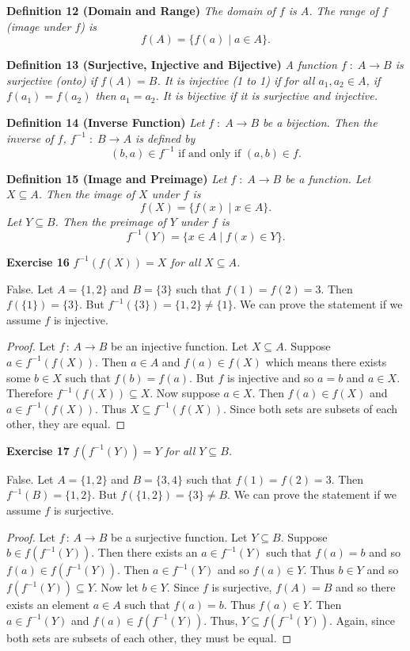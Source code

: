 \documentclass{article}
\begin{document}
\begin{flushleft}
\textbf{Definition 12 (Domain and Range)}
\textsl{The domain of $f$ is $A$. The range of $f$ (image under $f$) is
\[
f(A) = \{f(a) \mid a \in A\}.
\]}

\textbf{Definition 13 (Surjective, Injective and Bijective)}
\textsl{A function $f \; : \; A \rightarrow B$ is surjective (onto) if $f(A) = B$. It is injective (1 to 1) if for all $a_1,a_2 \in A$, if $f(a_1)=f(a_2)$ then $a_1=a_2$. It is bijective if it is surjective and injective.}\newline

\textbf{Definition 14 (Inverse Function)}
\textsl{Let $f \; : \; A \rightarrow B$ be a bijection. Then the inverse of $f$, $f^{-1} \; : \; B \rightarrow A$ is defined by
\[
(b,a) \in f^{-1} \text{ if and only if } (a,b) \in f.
\]}

\textbf{Definition 15 (Image and Preimage)}
\textsl{Let $f \; : \; A \rightarrow B$ be a function. Let $X \subseteq A$. Then the image of $X$ under $f$ is
\[
f(X) = \{f(x) \mid x \in A\}.
\]
Let $Y \subseteq B$. Then the preimage of $Y$ under $f$ is
\[
f^{-1}(Y) = \{x \in A \mid f(x) \in Y\}.
\]}

\textbf{Exercise 16}
\textsl{$f^{-1}(f(X)) = X$ for all $X \subseteq A$.}\newline

False. Let $A = \{1,2\}$ and $B = \{3\}$ such that $f(1)=f(2)=3$. Then $f(\{1\}) = \{3\}$. But $f^{-1}(\{3\})=\{1,2\} \neq \{1\}$. We can prove the statement if we assume $f$ is injective.

\begin{proof}
Let $f\, : \, A \rightarrow B$ be an injective function. Let $X \subseteq A$. Suppose $a \in f^{-1}(f(X))$. Then $a \in A$ and $f(a) \in f(X)$ which means there exists some $b \in X$ such that $f(b)=f(a)$. But $f$ is injective and so $a=b$ and $a \in X$. Therefore $f^{-1}(f(X)) \subseteq X$. Now suppose $a \in X$. Then $f(a) \in f(X)$ and $a \in f^{-1}(f(X))$. Thus $X \subseteq f^{-1}(f(X))$. Since both sets are subsets of each other, they are equal.
\end{proof}

\textbf{Exercise 17}
\textsl{$f(f^{-1}(Y))=Y$ for all $Y \subseteq B$.}\newline

False. Let $A = \{1,2\}$ and $B = \{3,4\}$ such that $f(1)=f(2)=3$. Then $f^{-1}(B) = \{1,2\}$. But $f(\{1,2\}) = \{3\} \neq B$. We can prove the statement if we assume $f$ is surjective.

\begin{proof}
Let $f\, : \, A \rightarrow B$ be a surjective function. Let $Y \subseteq B$. Suppose $b \in f(f^{-1}(Y))$. Then there exists an $a \in f^{-1}(Y)$ such that $f(a) = b$ and so $f(a) \in f(f^{-1}(Y))$. Then $a \in f^{-1}(Y)$ and so $f(a) \in Y$. Thus $b \in Y$ and so $f(f^{-1}(Y)) \subseteq Y$. Now let $b \in Y$. Since $f$ is surjective, $f(A) = B$ and so there exists an element $a \in A$ such that $f(a) = b$. Thus $f(a) \in Y$. Then $a \in f^{-1}(Y)$ and $f(a) \in f(f^{-1}(Y))$. Thus, $Y \subseteq f(f^{-1}(Y))$. Again, since both sets are subsets of each other, they must be equal.
\end{proof}


\end{flushleft}
\end{document}
